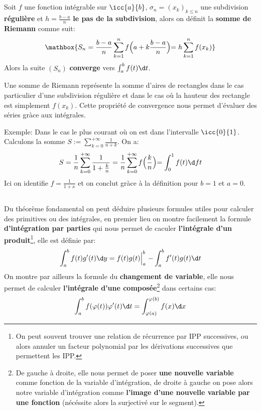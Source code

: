 \subsection*{}
Soit \(f\) une fonction intégrable sur \(\icc{a}{b}\), \(\sigma_n = (x_k)_{k \leq n}\) une subdivision \textbf{régulière} et \(h = \frac{b - a}{n}\) \textbf{le pas de la subdivision}, alors on définit la \textbf{somme de Riemann} comme suit:
\[
   \mathbox{S_n = \frac{b - a}{n} \sum_{k=1}^{n}f\Bigl(a + k\frac{b - a}{n}\Bigl) = h \sum_{k=1}^{n}f(x_k)}
\]
Alors la suite \((S_n)\) \textbf{converge} vers \(\int_{a}^{b} f(t) \d t\).\<

Une somme de Riemann représente la somme d'aires de rectangles dans le cas particulier d'une subdivision régulière et dans le cas où la hauteur des rectangle est simplement \(f(x_k)\). Cette propriété de convergence nous permet d'évaluer des séries gràce aux intégrales.\<

Exemple: Dans le cas le plus courant où on est dans l'intervalle \(\icc{0}{1}\). Calculons la somme \(S := \sum_{k=0}^{+\infty} \frac{1}{n + k}\). On a:
\[
   S =  \frac{1}{n}\sum_{k=0}^{+\infty} \frac{1}{1 + \frac{k}{n}} = \frac{1}{n}\sum_{k=0}^{+\infty} f\Bigl(\frac{k}{n}\Bigl) = \int_{0}^{1} f(t) \d ft
\]
Ici on identifie \(f = \frac{1}{1+x}\) et on conclut gràce à la définition pour \(b = 1\) et \(a = 0\).
\pagebreak

\subsection*{}
Du théorème fondamental on peut déduire plusieurs formules utiles pour calculer des primitives ou des intégrales, en premier lieu on montre facilement la formule \textbf{d'intégration par parties} qui nous permet de caculer \textbf{l'intégrale d'un produit}\footnote[1]{On peut souvent trouver une relation de récurrence par IPP successives, ou alors annuler un facteur polynomial par les dérivations successives que permettent les IPP.}, elle est définie par:
\[
   \int_{a}^{b} f(t)g'(t) \d y = f(t)g(t) \Bigl|_{a}^{b} \; - \int_{a}^{b} f'(t)g(t) \d t
\]
On montre par ailleurs la formule du \textbf{changement de variable}, elle nous permet de calculer \textbf{l'intégrale d'une composée}\footnote[2]{De gauche à droite, elle nous permet de poser \textbf{une nouvelle variable} comme fonction de la variable d'intégration, de droite à gauche on pose alors notre variable d'intégration comme \textbf{l'image d'une nouvelle variable par une fonction} (nécéssite alors la surjectivé sur le segment).} dans certains cas:
\[
   \int_{a}^{b} f(\varphi(t))\varphi'(t) \d t = \int_{\varphi(a)}^{\varphi(b)} f(x) \d x
\]

